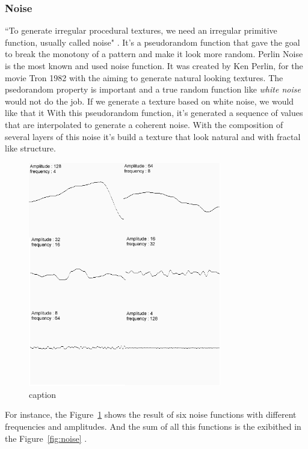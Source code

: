 
\subsubsection{Noise} %
\label{ssub:noise}


``To generate irregular procedural textures, we need an irregular primitive function, usually called noise" \cite{Ebert2002}. It's a pseudorandom function that gave the goal to break the monotony of a pattern and make it look more random.
Perlin Noise is the most known and used noise function. It was created by Ken Perlin, for the movie Tron 1982 with the aiming to generate natural looking textures.
The psedorandom property is important and a true random function like \emph{white noise} would not do the job. If we generate a texture based on white noise, we would like that it 
With this pseudorandom function, it's generated a sequence of values that are interpolated to generate a coherent noise. With the composition of several layers of this noise it's build a texture that look natural and with fractal like structure.


\begin{figure}[htbp]
	\centering
	\includegraphics[width=0.75\textwidth]{img/Theory/Perlin_Noise/Merge.png}
	\caption{caption}
	\label{fig:merge}
\end{figure}



For instance, the Figure~\ref{fig:merge} shows the result of six noise functions with different frequencies and amplitudes. And the sum of all this functions is the exibithed in the Figure~\ref{fig:noise} \cite{NoisesELIAS}.



